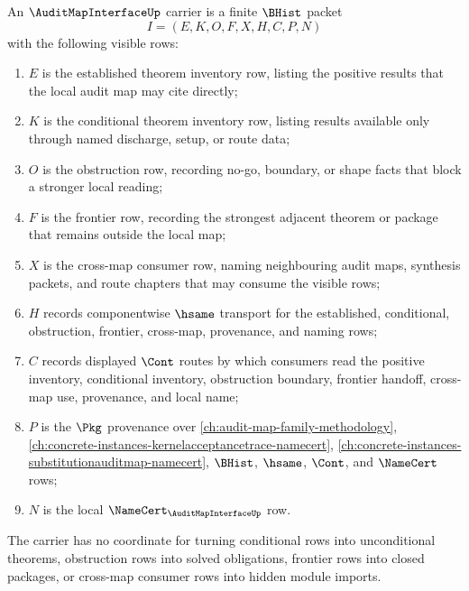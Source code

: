 \begin{definition}
\label{def:audit-map-interface-carrier}
An $\AuditMapInterfaceUp$ carrier is a finite $\BHist$ packet
$$
I=(E,K,O,F,X,H,C,P,N)
$$
with the following visible rows:
\begin{enumerate}
\item $E$ is the established theorem inventory row, listing the positive results that the local audit map may cite directly;
\item $K$ is the conditional theorem inventory row, listing results available only through named discharge, setup, or route data;
\item $O$ is the obstruction row, recording no-go, boundary, or shape facts that block a stronger local reading;
\item $F$ is the frontier row, recording the strongest adjacent theorem or package that remains outside the local map;
\item $X$ is the cross-map consumer row, naming neighbouring audit maps, synthesis packets, and route chapters that may consume the visible rows;
\item $H$ records componentwise $\hsame$ transport for the established, conditional, obstruction, frontier, cross-map, provenance, and naming rows;
\item $C$ records displayed $\Cont$ routes by which consumers read the positive inventory, conditional inventory, obstruction boundary, frontier handoff, cross-map use, provenance, and local name;
\item $P$ is the $\Pkg$ provenance over \autoref{ch:audit-map-family-methodology}, \autoref{ch:concrete-instances-kernelacceptancetrace-namecert}, \autoref{ch:concrete-instances-substitutionauditmap-namecert}, $\BHist$, $\hsame$, $\Cont$, and $\NameCert$ rows;
\item $N$ is the local $\NameCert_{\AuditMapInterfaceUp}$ row.
\end{enumerate}
The carrier has no coordinate for turning conditional rows into unconditional theorems, obstruction rows into solved obligations, frontier rows into closed packages, or cross-map consumer rows into hidden module imports.
\end{definition}

